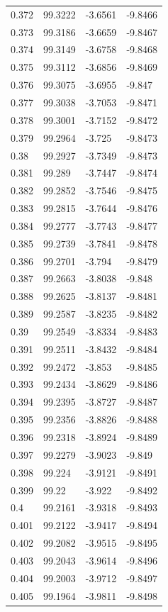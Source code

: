 \begin{tabular}{llll}
0.372 & 99.3222 & -3.6561 & -9.8466 \\
0.373 & 99.3186 & -3.6659 & -9.8467 \\
0.374 & 99.3149 & -3.6758 & -9.8468 \\
0.375 & 99.3112 & -3.6856 & -9.8469 \\
0.376 & 99.3075 & -3.6955 & -9.847 \\
0.377 & 99.3038 & -3.7053 & -9.8471 \\
0.378 & 99.3001 & -3.7152 & -9.8472 \\
0.379 & 99.2964 & -3.725 & -9.8473 \\
0.38 & 99.2927 & -3.7349 & -9.8473 \\
0.381 & 99.289 & -3.7447 & -9.8474 \\
0.382 & 99.2852 & -3.7546 & -9.8475 \\
0.383 & 99.2815 & -3.7644 & -9.8476 \\
0.384 & 99.2777 & -3.7743 & -9.8477 \\
0.385 & 99.2739 & -3.7841 & -9.8478 \\
0.386 & 99.2701 & -3.794 & -9.8479 \\
0.387 & 99.2663 & -3.8038 & -9.848 \\
0.388 & 99.2625 & -3.8137 & -9.8481 \\
0.389 & 99.2587 & -3.8235 & -9.8482 \\
0.39 & 99.2549 & -3.8334 & -9.8483 \\
0.391 & 99.2511 & -3.8432 & -9.8484 \\
0.392 & 99.2472 & -3.853 & -9.8485 \\
0.393 & 99.2434 & -3.8629 & -9.8486 \\
0.394 & 99.2395 & -3.8727 & -9.8487 \\
0.395 & 99.2356 & -3.8826 & -9.8488 \\
0.396 & 99.2318 & -3.8924 & -9.8489 \\
0.397 & 99.2279 & -3.9023 & -9.849 \\
0.398 & 99.224 & -3.9121 & -9.8491 \\
0.399 & 99.22 & -3.922 & -9.8492 \\
0.4 & 99.2161 & -3.9318 & -9.8493 \\
0.401 & 99.2122 & -3.9417 & -9.8494 \\
0.402 & 99.2082 & -3.9515 & -9.8495 \\
0.403 & 99.2043 & -3.9614 & -9.8496 \\
0.404 & 99.2003 & -3.9712 & -9.8497 \\
0.405 & 99.1964 & -3.9811 & -9.8498 \\

\end{tabular}
